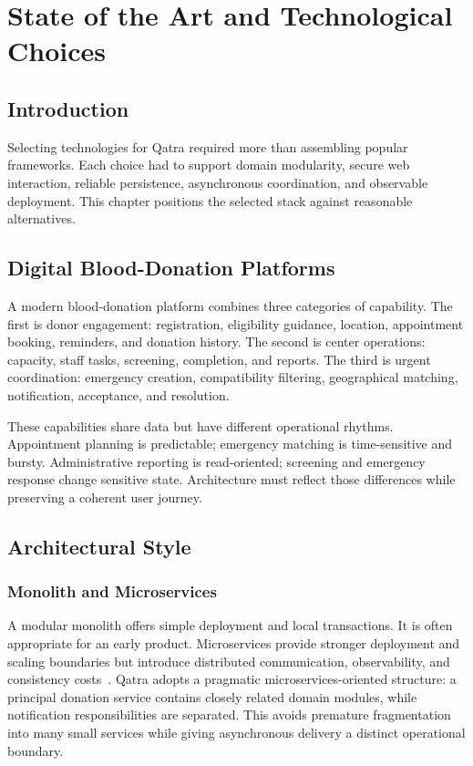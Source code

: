\chapter{State of the Art and Technological Choices}

\section*{Introduction}
Selecting technologies for Qatra required more than assembling popular frameworks. Each choice had to support domain modularity, secure web interaction, reliable persistence, asynchronous coordination, and observable deployment. This chapter positions the selected stack against reasonable alternatives.

\section{Digital Blood-Donation Platforms}
A modern blood-donation platform combines three categories of capability. The first is donor engagement: registration, eligibility guidance, location, appointment booking, reminders, and donation history. The second is center operations: capacity, staff tasks, screening, completion, and reports. The third is urgent coordination: emergency creation, compatibility filtering, geographical matching, notification, acceptance, and resolution.

These capabilities share data but have different operational rhythms. Appointment planning is predictable; emergency matching is time-sensitive and bursty. Administrative reporting is read-oriented; screening and emergency response change sensitive state. Architecture must reflect those differences while preserving a coherent user journey.

\section{Architectural Style}
\subsection{Monolith and Microservices}
A modular monolith offers simple deployment and local transactions. It is often appropriate for an early product. Microservices provide stronger deployment and scaling boundaries but introduce distributed communication, observability, and consistency costs~\cite{microservices}. Qatra adopts a pragmatic microservices-oriented structure: a principal donation service contains closely related domain modules, while notification responsibilities are separated. This avoids premature fragmentation into many small services while giving asynchronous delivery a distinct operational boundary.


